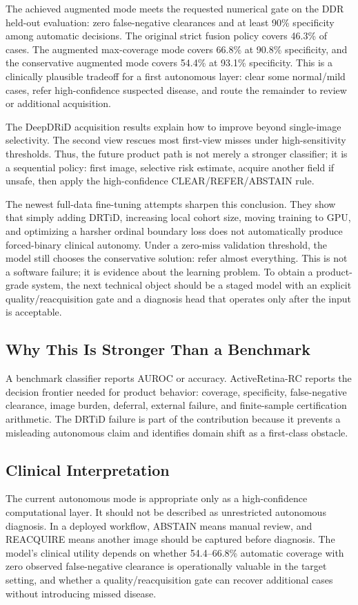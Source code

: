 \documentclass[journal]{IEEEtran}
\begin{document}
The achieved augmented mode meets the requested numerical gate on the DDR held-out evaluation: zero false-negative clearances and at least 90\% specificity among automatic decisions. The original strict fusion policy covers 46.3\% of cases. The augmented max-coverage mode covers 66.8\% at 90.8\% specificity, and the conservative augmented mode covers 54.4\% at 93.1\% specificity. This is a clinically plausible tradeoff for a first autonomous layer: clear some normal/mild cases, refer high-confidence suspected disease, and route the remainder to review or additional acquisition.

The DeepDRiD acquisition results explain how to improve beyond single-image selectivity. The second view rescues most first-view misses under high-sensitivity thresholds. Thus, the future product path is not merely a stronger classifier; it is a sequential policy: first image, selective risk estimate, acquire another field if unsafe, then apply the high-confidence CLEAR/REFER/ABSTAIN rule.

The newest full-data fine-tuning attempts sharpen this conclusion. They show that simply adding DRTiD, increasing local cohort size, moving training to GPU, and optimizing a harsher ordinal boundary loss does not automatically produce forced-binary clinical autonomy. Under a zero-miss validation threshold, the model still chooses the conservative solution: refer almost everything. This is not a software failure; it is evidence about the learning problem. To obtain a product-grade system, the next technical object should be a staged model with an explicit quality/reacquisition gate and a diagnosis head that operates only after the input is acceptable.

\subsection{Why This Is Stronger Than a Benchmark}
A benchmark classifier reports AUROC or accuracy. ActiveRetina-RC reports the decision frontier needed for product behavior: coverage, specificity, false-negative clearance, image burden, deferral, external failure, and finite-sample certification arithmetic. The DRTiD failure is part of the contribution because it prevents a misleading autonomous claim and identifies domain shift as a first-class obstacle.

\subsection{Clinical Interpretation}
The current autonomous mode is appropriate only as a high-confidence computational layer. It should not be described as unrestricted autonomous diagnosis. In a deployed workflow, ABSTAIN means manual review, and REACQUIRE means another image should be captured before diagnosis. The model's clinical utility depends on whether 54.4--66.8\% automatic coverage with zero observed false-negative clearance is operationally valuable in the target setting, and whether a quality/reacquisition gate can recover additional cases without introducing missed disease.
\end{document}
